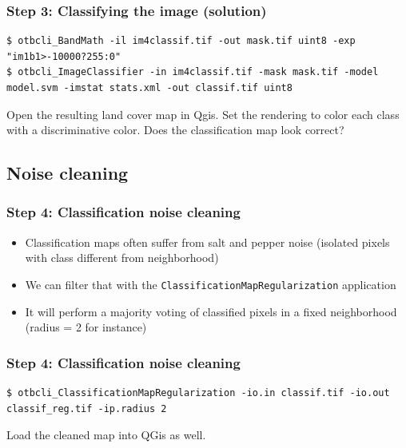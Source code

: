 \documentclass[8pt]{beamer}
\begin{document}
\begin{frame}[fragile]
\frametitle{Step 3: Classifying the image (solution)}

\begin{scriptsize}
\begin{verbatim}
$ otbcli_BandMath -il im4classif.tif -out mask.tif uint8 -exp "im1b1>-10000?255:0"
$ otbcli_ImageClassifier -in im4classif.tif -mask mask.tif -model model.svm -imstat stats.xml -out classif.tif uint8
\end{verbatim}
\end{scriptsize}
Open the resulting land cover map in Qgis. Set the rendering to color each class with a discriminative color. Does the classification map look correct?
\end{frame}


\subsection{Noise cleaning}

\begin{frame}
\frametitle{Step 4: Classification noise cleaning}

\begin{itemize}
\item Classification maps often suffer from salt and pepper noise (isolated pixels with class different from neighborhood)
\item We can filter that with the \texttt{ClassificationMapRegularization} application
\item It will perform a majority voting of classified pixels in a fixed neighborhood (radius = 2 for instance)
\end{itemize}

\end{frame}

\begin{frame}[fragile]
\frametitle{Step 4: Classification noise cleaning}
\begin{scriptsize}
\begin{verbatim}
$ otbcli_ClassificationMapRegularization -io.in classif.tif -io.out classif_reg.tif -ip.radius 2
\end{verbatim}
\end{scriptsize}

Load the cleaned map into QGis as well.

\end{frame}

\end{document}
